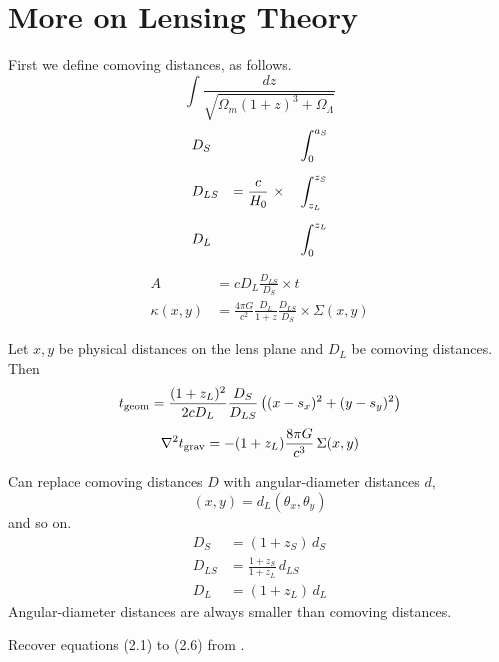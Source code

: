 \appendix

\section{More on Lensing Theory} \label{sec:more-theory}

First we define comoving distances, as follows.
\begin{equation}
\int \frac{dz}{\sqrt{\Omega_m(1+z)^3 + \Omega_\Lambda}}
\end{equation}
\begin{equation}
\begin{aligned}
&D_S    &                                &\int_0^{a_S} \\
\noalign{\medskip}
&D_{LS} & = \frac c{H_0} \ \times \quad  &\int_{z_L}^{z_S} \\
\noalign{\medskip}
&D_L    &                                &\int_0^{z_L}
\end{aligned}
\end{equation}

\begin{equation}
\begin{aligned}
A           &= cD_L \frac{D_{LS}}{D_S} \times t \\
\kappa(x,y) &= \frac{4\pi G}{c^2} \frac{D_L}{1+z} \frac{D_{LS}}{D_S}
               \times \Sigma(x,y)
\end{aligned}
\end{equation}

Let $x,y$ be physical distances on the lens plane and $D_L$ be
comoving distances.  Then
\begin{equation}
t_{\rm geom} = \frac{(1+z_L)^2}{2cD_L} \frac{D_S}{D_{LS}}
\left( (x-s_x)^2 + (y-s_y)^2 \right)
\end{equation}
\begin{equation}
\nabla^2 t_{\rm grav} = -(1+z_L)\frac{8\pi G}{c^3} \, \Sigma(x,y)
\end{equation}

Can replace comoving distances $D$ with angular-diameter distances
$d$,
\begin{equation}
(x,y) = d_L (\theta_x,\theta_y)
\end{equation}
and so on.
\begin{equation}
\begin{aligned}
D_S &= (1+z_S) \, d_S \\
D_{LS} &= \frac{1+z_S}{1+z_L} \, d_{LS} \\
D_L &= (1+z_L) \, d_L
\end{aligned}
\end{equation}
Angular-diameter distances are always smaller than comoving distances.

Recover equations (2.1) to (2.6) from \cite{1986ApJ...310..568B}.
